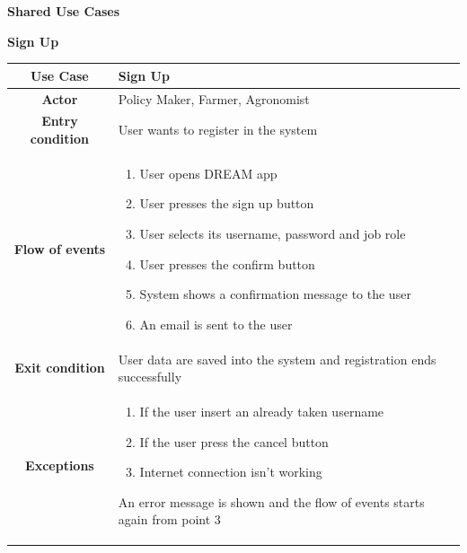 \documentclass[table, 12pt]{article}
\begin{document}
        \begin{itemize}
            \item \textbf {Shared Use Cases}
            
            \begin{table}[H]
                \item[] \textbf{Sign Up}
                \item[] 
                \centering
                \begin{tabular}{|c |m{}|}
                    \hline
                    \textbf{Use Case} & Sign Up\\ \hline
                    \textbf{Actor} & Policy Maker, Farmer, Agronomist\\ \hline
                    \textbf{Entry condition} & User wants to register in the system\\  \hline
                    \textbf{Flow of events} & \begin{enumerate}
                                                \item User opens DREAM app
                                                \item User presses the sign up button
                                                \item User selects its username, password and job role
                                                \item User presses the confirm button
                                                \item System shows a confirmation message to the user
                                                \item An email is sent to the user
                                            \end{enumerate}\\ \hline
                    \textbf{Exit condition} & User data are saved into the system and registration ends successfully  \\ \hline
                    \textbf{Exceptions} &  \begin{enumerate}
                        \item If the user insert an already taken username
                        \item If the user press the cancel button
                        \item Internet connection isn't working
                    \end{enumerate}
                    An error message is shown and the flow of events starts again from point 3\\ \hline                    
                \end{tabular}
            \end{table}


\end{itemize}
\end{document}
